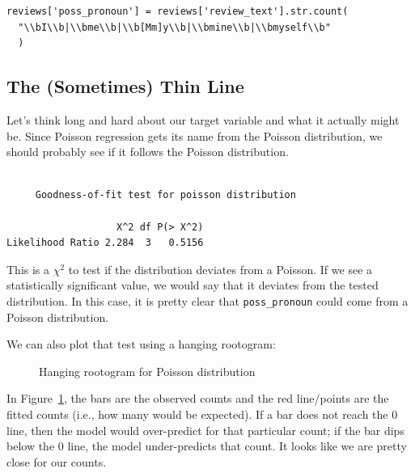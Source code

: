 \documentclass[
  letterpaper,
]{krantz}
\begin{document}
\begin{verbatim}
reviews['poss_pronoun'] = reviews['review_text'].str.count(
  "\\bI\\b|\\bme\\b|\\b[Mm]y\\b|\\bmine\\b|\\bmyself\\b"
  )
\end{verbatim}

\subsection{The (Sometimes) Thin Line}\label{sec-glm-thinline}

Let's think long and hard about our target variable and what it actually
might be. Since Poisson regression gets its name from the Poisson
distribution, we should probably see if it follows the Poisson
distribution.

\begin{verbatim}

     Goodness-of-fit test for poisson distribution

                   X^2 df P(> X^2)
Likelihood Ratio 2.284  3   0.5156
\end{verbatim}

This is a \(\chi^2\) to test if the distribution deviates from a
Poisson. If we see a statistically significant value, we would say that
it deviates from the tested distribution. In this case, it is pretty
clear that \texttt{poss\_pronoun} could come from a Poisson
distribution.

We can also plot that test using a hanging rootogram:

\begin{figure}[H]


\caption{\label{fig-poisson-test}Hanging rootogram for Poisson
distribution}

\end{figure}%

In Figure~\ref{fig-poisson-test}, the bars are the observed counts and
the red line/points are the fitted counts (i.e., how many would be
expected). If a bar does not reach the 0 line, then the model would
over-predict for that particular count; if the bar dips below the 0
line, the model under-predicts that count. It looks like we are pretty
close for our counts.
\end{document}
